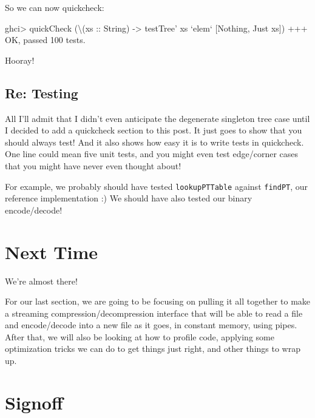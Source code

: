 \documentclass[]{article}
\newenvironment{Shaded}{}{}
\newcommand{\DataTypeTok}[1]{\textcolor[rgb]{0.56,0.13,0.00}{#1}}
\newcommand{\DecValTok}[1]{\textcolor[rgb]{0.25,0.63,0.44}{#1}}
\newcommand{\FunctionTok}[1]{\textcolor[rgb]{0.02,0.16,0.49}{#1}}
\newcommand{\NormalTok}[1]{#1}
\newcommand{\OtherTok}[1]{\textcolor[rgb]{0.00,0.44,0.13}{#1}}
\begin{document}
So we can now quickcheck:

\begin{Shaded}
\begin{Highlighting}[]
\NormalTok{ghci}\FunctionTok{>}\NormalTok{ quickCheck (\textbackslash{}(}\OtherTok{xs ::} \DataTypeTok{String}\NormalTok{) }\OtherTok{->}\NormalTok{ testTree' xs }\OtherTok{`elem`}\NormalTok{ [}\DataTypeTok{Nothing}\NormalTok{, }\DataTypeTok{Just}\NormalTok{ xs])}
\FunctionTok{+++} \DataTypeTok{OK}\NormalTok{, passed }\DecValTok{100}\NormalTok{ tests}\FunctionTok{.}
\end{Highlighting}
\end{Shaded}

Hooray!

\hypertarget{re-testing}{%
\subsection{Re: Testing}\label{re-testing}}

All I'll admit that I didn't even anticipate the degenerate singleton tree case
until I decided to add a quickcheck section to this post. It just goes to show
that you should always test! And it also shows how easy it is to write tests in
quickcheck. One line could mean five unit tests, and you might even test
edge/corner cases that you might have never even thought about!

For example, we probably should have tested \texttt{lookupPTTable} against
\texttt{findPT}, our reference implementation :) We should have also tested our
binary encode/decode!

\hypertarget{next-time}{%
\section{Next Time}\label{next-time}}

We're almost there!

For our last section, we are going to be focusing on pulling it all together to
make a streaming compression/decompression interface that will be able to read a
file and encode/decode into a new file as it goes, in constant memory, using
pipes. After that, we will also be looking at how to profile code, applying some
optimization tricks we can do to get things just right, and other things to wrap
up.

\hypertarget{signoff}{%
\section{Signoff}\label{signoff}}
\end{document}
